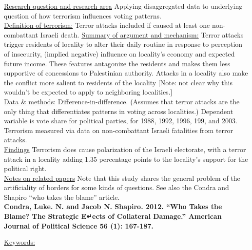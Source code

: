 \documentclass{article}[12pt]
\begin{document}
\underline{Research question and research area} Applying disaggregated data to underlying question of how terrorism influences voting patterns. \\
\underline{Definition of terrorism:} Terror attacks included if caused at least one non-combattant Israeli death.
\underline{Summary of argument and mechanism:} Terror attacks trigger residents of locality to alter their daily routine in response to perception of insecurity, (implied negative) influence on locality's economy and expected future income. These features antagonize the residents and makes them less supportive of concessions to Palestinian authority. Attacks in a locality also make the conflict more salient to residents of the locality [Note: not clear why this wouldn't be expected to apply to neighboring localities.]\\
\underline{Data \& methods:} Difference-in-difference. (Assumes that terror attacks are the only thing that differentiates patterns in voting across localities.) Dependent variable is vote share for political parties, for 1988, 1992, 1996, 199, and 2003. Terrorism measured via data on non-combattant Israeli fatalities from terror attacks.\\
\underline{Findings} Terrorism does cause polarization of the Israeli electorate, with a terror attack in a locality adding 1.35 percentage points to the locality's support for the political right.\\
\underline{Notes on related papers} Note that this study shares the general problem of the artificiality of borders for some kinds of questions. See also the Condra and Shapiro ``who takes the blame'' article. \\

\textbf{Condra, Luke. N. and Jacob N. Shapiro. 2012. “Who Takes the Blame? The Strategic E↵ects
of Collateral Damage.” American Journal of Political Science 56 (1): 167-187.}


\underline{Keywords:}
\end{document}
